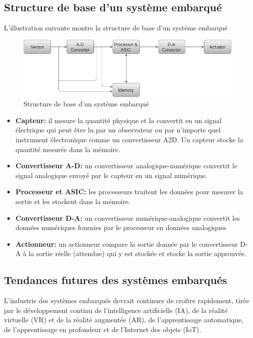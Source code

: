 \subsection{Structure de base d'un système embarqué}
L'illustration suivante montre la structure de base d'un système embarqué 

\begin{figure}[H]
    \centering
    \includegraphics[scale=0.6]{chap1/embedded_systems_structure.jpg}
    \caption{Structure de base d'un système embarqué}
    \label{fig:se}
\end{figure}
\begin{itemize}
    \item \textbf{Capteur:} il mesure la quantité physique et la convertit en un signal électrique qui peut être lu par un observateur ou par n'importe quel instrument électronique comme un convertisseur A2D. Un capteur stocke la quantité mesurée dans la mémoire.

\item \textbf{Convertisseur A-D:} un convertisseur analogique-numérique convertit le signal analogique envoyé par le capteur en un signal numérique.

\item \textbf{Processeur et ASIC:} les processeurs traitent les données pour mesurer la sortie et les stockent dans la mémoire.

\item \textbf{Convertisseur D-A:} un convertisseur numérique-analogique convertit les données numériques fournies par le processeur en données analogiques

\item \textbf{Actionneur:} un actionneur compare la sortie donnée par le convertisseur D-A à la sortie réelle (attendue) qui y est stockée et stocke la sortie approuvée.
\end{itemize}
\subsection{Tendances futures des systèmes embarqués}
L'industrie des systèmes embarqués devrait continuer de croître rapidement, tirée par le développement continu de l'intelligence artificielle (IA), de la réalité virtuelle (VR) et de la réalité augmentée (AR), de l'apprentissage automatique, de l'apprentissage en profondeur et de l'Internet des objets (IoT).

